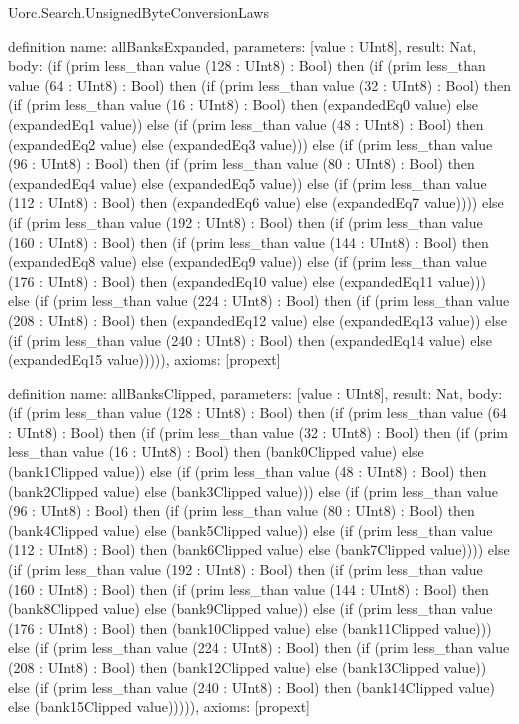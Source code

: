 \begin{lexlean}{Uorc.Search.UnsignedByteConversionLaws}
\begin{semanticmodule}
definition{
  name: allBanksExpanded,
  parameters: [value : UInt8],
  result: Nat,
  body: (if (prim less_than value (128 : UInt8) : Bool) then (if (prim less_than value (64 : UInt8) : Bool) then (if (prim less_than value (32 : UInt8) : Bool) then (if (prim less_than value (16 : UInt8) : Bool) then (expandedEq0 value) else (expandedEq1 value)) else (if (prim less_than value (48 : UInt8) : Bool) then (expandedEq2 value) else (expandedEq3 value))) else (if (prim less_than value (96 : UInt8) : Bool) then (if (prim less_than value (80 : UInt8) : Bool) then (expandedEq4 value) else (expandedEq5 value)) else (if (prim less_than value (112 : UInt8) : Bool) then (expandedEq6 value) else (expandedEq7 value)))) else (if (prim less_than value (192 : UInt8) : Bool) then (if (prim less_than value (160 : UInt8) : Bool) then (if (prim less_than value (144 : UInt8) : Bool) then (expandedEq8 value) else (expandedEq9 value)) else (if (prim less_than value (176 : UInt8) : Bool) then (expandedEq10 value) else (expandedEq11 value))) else (if (prim less_than value (224 : UInt8) : Bool) then (if (prim less_than value (208 : UInt8) : Bool) then (expandedEq12 value) else (expandedEq13 value)) else (if (prim less_than value (240 : UInt8) : Bool) then (expandedEq14 value) else (expandedEq15 value))))),
  axioms: [propext]
}

definition{
  name: allBanksClipped,
  parameters: [value : UInt8],
  result: Nat,
  body: (if (prim less_than value (128 : UInt8) : Bool) then (if (prim less_than value (64 : UInt8) : Bool) then (if (prim less_than value (32 : UInt8) : Bool) then (if (prim less_than value (16 : UInt8) : Bool) then (bank0Clipped value) else (bank1Clipped value)) else (if (prim less_than value (48 : UInt8) : Bool) then (bank2Clipped value) else (bank3Clipped value))) else (if (prim less_than value (96 : UInt8) : Bool) then (if (prim less_than value (80 : UInt8) : Bool) then (bank4Clipped value) else (bank5Clipped value)) else (if (prim less_than value (112 : UInt8) : Bool) then (bank6Clipped value) else (bank7Clipped value)))) else (if (prim less_than value (192 : UInt8) : Bool) then (if (prim less_than value (160 : UInt8) : Bool) then (if (prim less_than value (144 : UInt8) : Bool) then (bank8Clipped value) else (bank9Clipped value)) else (if (prim less_than value (176 : UInt8) : Bool) then (bank10Clipped value) else (bank11Clipped value))) else (if (prim less_than value (224 : UInt8) : Bool) then (if (prim less_than value (208 : UInt8) : Bool) then (bank12Clipped value) else (bank13Clipped value)) else (if (prim less_than value (240 : UInt8) : Bool) then (bank14Clipped value) else (bank15Clipped value))))),
  axioms: [propext]
}


\end{semanticmodule}
\end{lexlean}
